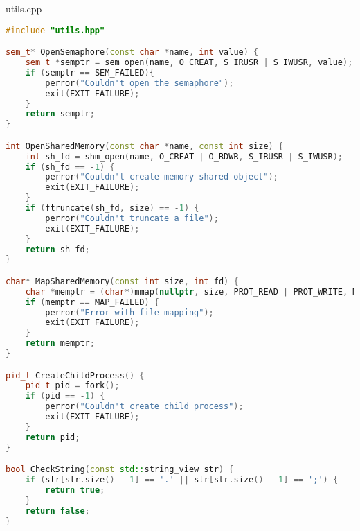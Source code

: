 \documentclass[a4paper, 12pt]{article}
\begin{document}
utils.cpp
\begin{lstlisting}[language=C++]
#include "utils.hpp"

sem_t* OpenSemaphore(const char *name, int value) {
    sem_t *semptr = sem_open(name, O_CREAT, S_IRUSR | S_IWUSR, value);
    if (semptr == SEM_FAILED){
        perror("Couldn't open the semaphore");
        exit(EXIT_FAILURE);
    }
    return semptr;
}

int OpenSharedMemory(const char *name, const int size) {
    int sh_fd = shm_open(name, O_CREAT | O_RDWR, S_IRUSR | S_IWUSR);
    if (sh_fd == -1) {
        perror("Couldn't create memory shared object");
        exit(EXIT_FAILURE);
    }
    if (ftruncate(sh_fd, size) == -1) {
        perror("Couldn't truncate a file");
        exit(EXIT_FAILURE);
    }
    return sh_fd;
}

char* MapSharedMemory(const int size, int fd) {
    char *memptr = (char*)mmap(nullptr, size, PROT_READ | PROT_WRITE, MAP_SHARED, fd, 0);
    if (memptr == MAP_FAILED) {
        perror("Error with file mapping");
        exit(EXIT_FAILURE);
    }
    return memptr;
}

pid_t CreateChildProcess() {
    pid_t pid = fork();
    if (pid == -1) {
        perror("Couldn't create child process");
        exit(EXIT_FAILURE);
    }
    return pid;
}

bool CheckString(const std::string_view str) {
    if (str[str.size() - 1] == '.' || str[str.size() - 1] == ';') {
        return true;
    }
    return false;
}
\end{lstlisting}
\end{document}
